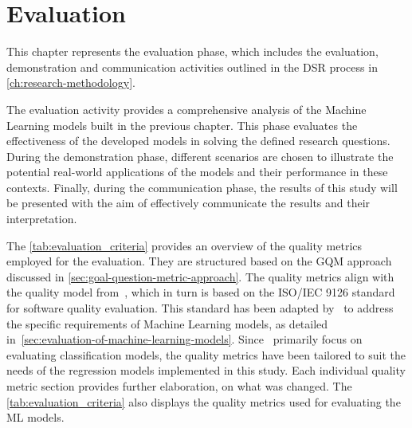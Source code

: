 \chapter{Evaluation}\label{ch:evaluation}
This chapter represents the evaluation phase, which includes the evaluation, demonstration and
communication activities outlined in the \ac{DSR} process in \cref{ch:research-methodology}.

The evaluation activity provides a comprehensive analysis of the Machine Learning models built in the
previous chapter.
This phase evaluates the effectiveness of the developed models in solving the defined research questions.
During the demonstration phase, different scenarios are chosen to illustrate the potential real-world applications of
the models and their performance in these contexts.
Finally, during the communication phase, the results of this study will be presented with the aim of effectively
communicate the results and their interpretation.

The \cref{tab:evaluation_criteria} provides an overview of the quality metrics employed for the evaluation.
They are structured based on the \ac{GQM} approach discussed in \cref{sec:goal-question-metric-approach}.
The quality metrics align with the quality model from~\cite{siebert2022construction}, which in turn is based on
the ISO/IEC 9126 standard for software quality evaluation.
This standard has been adapted by~\cite{siebert2022construction} to address the specific requirements of Machine
Learning models, as detailed in~\cref{sec:evaluation-of-machine-learning-models}.
Since~\cite{siebert2022construction} primarily focus on evaluating classification models, the quality metrics have
been tailored to suit the needs of the regression models implemented in this study.
Each individual quality metric section provides further elaboration, on what was changed.
The \cref{tab:evaluation_criteria} also displays the quality metrics used for evaluating the \ac{ML} models.

